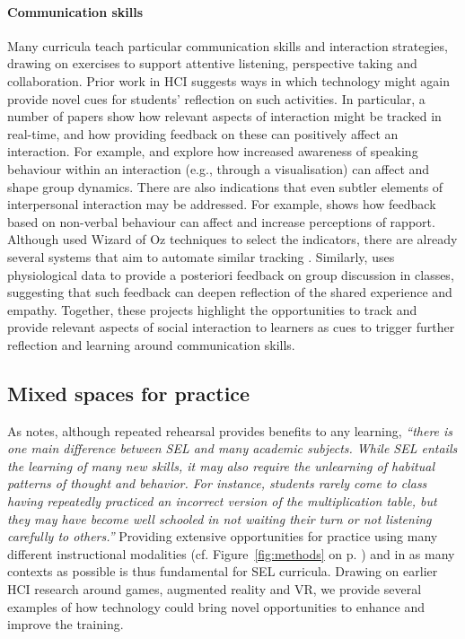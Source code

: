 \documentclass[prodmode,acmtochi]{acmsmall}
\newcommand{\todolater}[1]{}
\newcommand{\inqq}[1]{\textrm{\textit{``#1''}}}
\begin{document}
\paragraph{Communication skills}
\label{sec:strategies}
Many curricula teach particular communication skills and interaction strategies, drawing on exercises to support attentive listening, perspective taking and collaboration. 
%
Prior work in HCI suggests ways in which technology might again provide novel cues for students' reflection on such activities. In particular, a number of papers show how relevant aspects of interaction might be tracked in real-time, and how providing feedback on these can positively affect an interaction. For example,   and  explore how increased awareness of speaking behaviour within an interaction (e.g., through a visualisation) can affect and shape group dynamics. 
There are also indications that even subtler elements of interpersonal interaction may be addressed. For example,  shows how feedback based on non-verbal behaviour can affect and increase perceptions of rapport. Although  used Wizard of Oz techniques to select the indicators, there are already several systems that aim to automate similar tracking \cite{Sun2011,Hagad2011}. Similarly,  uses physiological data to provide a posteriori feedback on group discussion in classes, suggesting that such feedback can deepen reflection of the shared experience and empathy. 
%
Together, these projects highlight the opportunities to track and provide relevant aspects of social interaction to learners as cues to trigger further reflection and learning around communication skills. 
\todolater{???but could also serve as a scaffolding to promote deeper discussion with the group, cf. Section~\ref{sec:socialReflection} below.}






\subsection{Mixed spaces for practice}
\label{sec:mixedSpaces}

 As \cite[p. 55]{Elias1997} notes, although repeated rehearsal  provides benefits to any learning, \inqq{there is one main difference between SEL and many academic subjects. While SEL entails the learning of many new skills, it may also require the unlearning of habitual patterns of thought and behavior. For instance, students rarely come to class having repeatedly practiced an incorrect version of the multiplication table, but they may have become well schooled in not waiting their turn or not listening carefully to others.} Providing extensive opportunities for practice using many different instructional modalities (cf. Figure~\ref{fig:methods} on p. \pageref{fig:methods}) and in as many contexts as possible is thus fundamental for SEL curricula. 
%
Drawing on earlier HCI research around games, augmented reality and VR, we provide several examples of how technology could bring novel opportunities to enhance and improve the training. 
\end{document}
